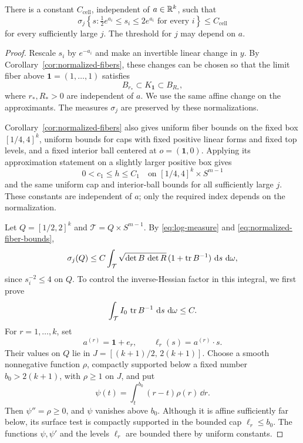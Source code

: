 \begin{lemma}\label{lem:log-cell-bound}
There is a constant \(C_{\mathrm{cell}}\), independent of
\(a\in\mathbb R^k\), such that
\[
 \sigma_j\left\{s:\tfrac12e^{a_i}\le s_i\le2e^{a_i}
                       \text{ for every }i\right\}
 \le C_{\mathrm{cell}}
\]
for every sufficiently large \(j\).  The threshold for \(j\) may depend
on \(a\).
\end{lemma}

\begin{proof}
Rescale \(s_i\) by \(e^{-a_i}\) and make an invertible linear change in
\(y\).  By Corollary~\ref{cor:normalized-fibers}, these changes can be chosen
so that the limit fiber above \(\mathbf1=(1,\ldots,1)\) satisfies
\[
 B_{r_*}\subset K_{\mathbf1}\subset B_{R_*},
\]
where \(r_*,R_*>0\) are independent of \(a\).
We use the same affine change on the approximants.
The measures \(\sigma_j\) are preserved by these normalizations.

Corollary~\ref{cor:normalized-fibers} also gives uniform fiber bounds on
the fixed box \([1/4,4]^k\), uniform bounds for caps with fixed positive
linear forms and fixed top levels, and a fixed interior ball centered at
\(o=(\mathbf1,0)\).  Applying its approximation statement on a slightly
larger positive box gives
\begin{equation}\label{eq:normalized-fiber-bounds}
 0<c_1\le h\le C_1
 \quad\text{on }[1/4,4]^k\times S^{m-1}
\end{equation}
and the same uniform cap and interior-ball bounds for all sufficiently
large \(j\).  These constants are independent of \(a\); only the
required index depends on the normalization.

Let \(Q=[1/2,2]^k\) and \(\mathcal T=Q\times S^{m-1}\).
By \eqref{eq:log-measure} and \eqref{eq:normalized-fiber-bounds},
\[
 \sigma_j(Q)\le C\int_{\mathcal T}
       \sqrt{\det B\,\det R}\,(1+\operatorname{tr} B^{-1})
       \,\mathop{}\!\mathrm d s\,\mathop{}\!\mathrm d\omega,
\]
since \(s_i^{-2}\le4\) on \(Q\).  To control the inverse-Hessian
factor in this integral, we first prove
\begin{equation}\label{eq:cap-inverse-hessian}
 \int_{\mathcal T} I_0\,\operatorname{tr} B^{-1}\,\mathop{}\!\mathrm d s\,\mathop{}\!\mathrm d\omega\le C.
\end{equation}
For \(r=1,\ldots,k\), set
\[
 a^{(r)}=\mathbf1+e_r,\qquad \ell_r(s)=a^{(r)}\cdot s.
\]
Their values on \(Q\) lie in
\(J=[(k+1)/2,\,2(k+1)]\).
Choose a smooth nonnegative function \(\rho\), compactly supported
below a fixed number \(b_0>2(k+1)\), with \(\rho\ge1\) on \(J\),
and put
\[
 \psi(t)=\int_t^{b_0}(r-t)\rho(r)\,\dd r.
\]
Then \(\psi''=\rho\ge0\), and \(\psi\) vanishes above \(b_0\).
Although it is affine sufficiently far below, its surface test is
compactly supported in the bounded cap \(\ell_r\le b_0\).
The functions \(\psi,\psi'\) and the levels \(\ell_r\) are bounded there
by uniform constants.


\end{proof}
